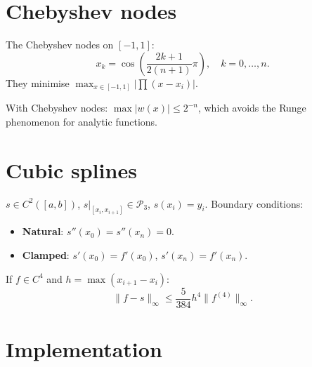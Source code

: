 \begin{center}
\end{center}

\section{Chebyshev nodes}

\begin{definition}
The Chebyshev nodes on $[-1,1]$:
\[
x_k = \cos\left(\frac{2k+1}{2(n+1)}\pi\right), \quad k=0,\ldots,n.
\]
They minimise $\max_{x\in[-1,1]}|\prod(x-x_i)|$.
\end{definition}

\begin{theorem}
With Chebyshev nodes: $\max|w(x)|\leq 2^{-n}$, which avoids the Runge phenomenon for analytic functions.
\end{theorem}

\section{Cubic splines}

\begin{definition}
$s\in C^2([a,b])$, $s|_{[x_i,x_{i+1}]}\in\mathcal{P}_3$, $s(x_i)=y_i$. Boundary conditions:
\begin{itemize}
\item \textbf{Natural}: $s''(x_0)=s''(x_n)=0$.
\item \textbf{Clamped}: $s'(x_0)=f'(x_0)$, $s'(x_n)=f'(x_n)$.
\end{itemize}
\end{definition}

\begin{theorem}
If $f\in C^4$ and $h=\max(x_{i+1}-x_i)$:
\[
\|f-s\|_\infty \leq \frac{5}{384}h^4\|f^{(4)}\|_\infty.
\]
\end{theorem}

\section{Implementation}

